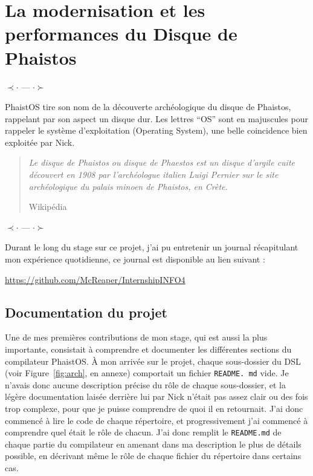 \section{La modernisation et les performances du Disque de Phaistos}
\label{contrib}

\begin{center}
    $\prec \cdot$ --- $\cdot \succ$ 
\end{center}

PhaistOS tire son nom de la découverte archéologique du disque de Phaistos, 
rappelant par son aspect un disque dur. Les lettres ``OS'' sont en majuscules 
pour rappeler le système d'exploitation (Operating System), une belle 
coincidence bien exploitée par Nick. 

\blockquote[Wikipédia][--]{\textit{Le disque de Phaistos ou disque de Phaestos 
est un disque d'argile cuite découvert en 1908 par l'archéologue italien Luigi 
Pernier sur le site archéologique du palais minoen de Phaistos, en Crète.}
}

\begin{center}
    $\prec \cdot$ --- $\cdot \succ$ 
\end{center}

Durant le long du stage sur ce projet, j'ai pu entretenir un journal 
récapitulant mon expérience quotidienne, ce journal est disponible au lien 
suivant :

\begin{center}
\href{https://github.com/McReaper/InternshipINFO4}{https://github.com/McReaper/InternshipINFO4}
\end{center}

\subsection{Documentation du projet}

Une de mes premières contributions de mon stage, qui est aussi la plus 
importante, consistait à comprendre et documenter les différentes sections du 
compilateur PhaistOS. À mon arrivée sur le projet, chaque sous-dossier du DSL 
(voir Figure~\ref{fig:arch}, en annexe) comportait un fichier \texttt{README.
md} vide. Je n'avais donc aucune description précise du rôle de chaque 
sous-dossier, et la légère documentation laisée derrière lui par Nick n'était 
pas assez clair ou des fois trop complexe, pour que je puisse comprendre de 
quoi il en retournait. J'ai donc commencé à lire le code de chaque répertoire, 
et progressivement j'ai commencé à comprendre quel était le rôle de chacun. 
J'ai donc remplit le \texttt{README.md} de chaque partie du compilateur en 
amenant dans ma description le plus de détails possible, en décrivant même le 
rôle de chaque fichier du répertoire dans certains cas. 


